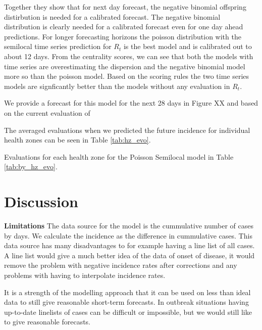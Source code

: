 \documentclass[12pt]{article}
\begin{document}
Together they show that for next day forecast, the negative binomial offspring distirbution is needed for a calibrated forecast. The negative binomial distribution is clearly needed for a calibrated forecast even for one day ahead predictions. For longer forecasting horizons the poisson distribution with the semilocal time series prediction for $R_t$ is the best model and is calibrated out to about 12 days. From the centrality scores, we can see that both the models with time series are overestimating the dispersion and the negative binomial model more so than the poisson model. Based on the scoring rules the two time series models are signficantly better than the models without any evaluation in $R_t$.

We provide a forecast for this model for the next 28 days in Figure XX and based on the current evaluation of 

The averaged evaluations when we predicted the future incidence for individual health zones can be seen in Table \ref{tab:hz_evo}.


Evaluations for each health zone for the Poisson Semilocal model in Table \ref{tab:by_hz_evo}.



\section{Discussion}




{\bf Limitations}
The data source for the model is the cummulative number of cases by days. We calculate the incidence as the difference in cummulative cases. This data source has many disadvantages to for example having a line list of all cases. A line list would give a much better idea of the data of onset of disease, it would remove the problem with negative incidence rates after corrections and any problems with having to interpolate incidence rates.

It is a strength of the modelling approach that it can be used on less than ideal data to still give reasonable short-term forecasts. In outbreak situations having up-to-date linelists of cases can be difficult or impossible, but we would still like to give reasonable forecasts. 
\end{document}
